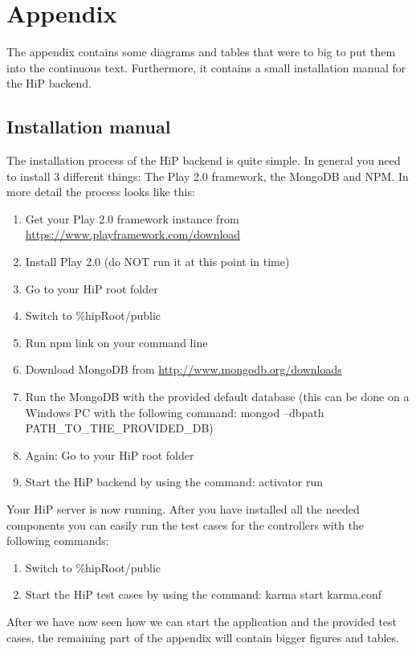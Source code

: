 \chapter{Appendix}
The appendix contains some diagrams and tables that were to big to put them into the continuous text. Furthermore, it contains a small installation manual for the \ac{HiP} backend.

\section{Installation manual}
The installation process of the \ac{HiP} backend is quite simple. In general you need to install 3 different things: The Play 2.0 framework, the MongoDB and \ac{NPM}. In more detail the process looks like this:

\begin{enumerate}
	\item Get your Play 2.0 framework instance from \url{https://www.playframework.com/download}
	\item Install Play 2.0 (do NOT run it at this point in time)
	\item Go to your \ac{HiP} root folder
	\item Switch to \%hipRoot/public
	\item Run npm link on your command line
	\item Download MongoDB from \url{http://www.mongodb.org/downloads}
	\item Run the MongoDB with the provided default database (this can be done on a Windows PC with the following command: mongod --dbpath PATH_TO_THE_PROVIDED_DB)
	\item Again: Go to your \ac{HiP} root folder
	\item	Start the \ac{HiP} backend by using the command: activator run
\end{enumerate}

Your \ac{HiP} server is now running. After you have installed all the needed components you can easily run the test cases for the controllers with the following commands:

\begin{enumerate}
	\item Switch to \%hipRoot/public
	\item	Start the \ac{HiP} test cases by using the command: karma start karma.conf
\end{enumerate}

After we have now seen how we can start the application and the provided test cases, the remaining part of the appendix will contain bigger figures and tables.

